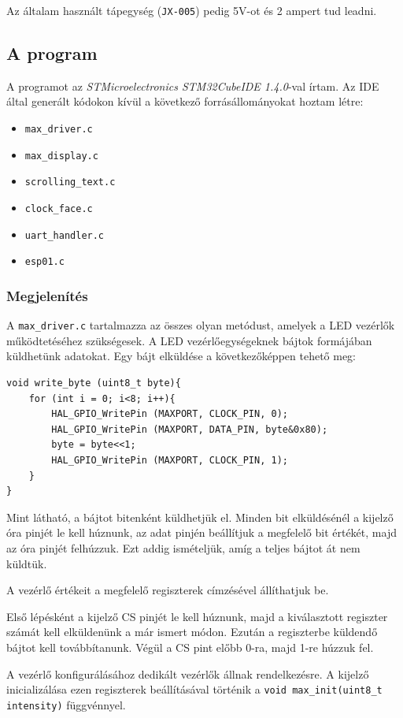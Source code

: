 \documentclass[a4paper, 12pt]{article}
\begin{document}
Az általam használt tápegység (\texttt{JX-005}) pedig 5V-ot és 2 ampert tud leadni.

\subsection{A program}

A programot az \textit{STMicroelectronics STM32CubeIDE 1.4.0}-val írtam.
Az IDE által generált kódokon kívül a következő forrásállományokat hoztam létre:
\begin{itemize}[noitemsep]
	\item \texttt{max\_driver.c}
	\item \texttt{max\_display.c}
	\item \texttt{scrolling\_text.c}
	\item \texttt{clock\_face.c}
	\item \texttt{uart\_handler.c}
	\item \texttt{esp01.c}
\end{itemize}

\subsubsection{Megjelenítés}

A \texttt{max\_driver.c} tartalmazza az összes olyan metódust, amelyek a LED vezérlők működtetéséhez szükségesek.
A LED vezérlőegységeknek bájtok formájában küldhetünk adatokat.
Egy bájt elküldése a következőképpen tehető meg:
\begin{lstlisting}[style=CStyle]
void write_byte (uint8_t byte){
	for (int i = 0; i<8; i++){
		HAL_GPIO_WritePin (MAXPORT, CLOCK_PIN, 0);
		HAL_GPIO_WritePin (MAXPORT, DATA_PIN, byte&0x80);
		byte = byte<<1;
		HAL_GPIO_WritePin (MAXPORT, CLOCK_PIN, 1);
	}
}
\end{lstlisting}
Mint látható, a bájtot bitenként küldhetjük el. Minden bit elküldésénél a kijelző óra pinjét le kell húznunk, az adat pinjén beállítjuk a megfelelő bit értékét, majd az óra pinjét felhúzzuk. Ezt addig ismételjük, amíg a teljes bájtot át nem küldtük.

A vezérlő értékeit a megfelelő regiszterek címzésével állíthatjuk be.

Első lépésként a kijelző CS pinjét le kell húznunk, majd a kiválasztott regiszter számát kell elküldenünk a már ismert módon. Ezután a regiszterbe küldendő bájtot kell továbbítanunk. Végül a CS pint előbb 0-ra, majd 1-re húzzuk fel.

A vezérlő konfigurálásához dedikált vezérlők állnak rendelkezésre. A kijelző inicializálása ezen regiszterek beállításával történik a \texttt{void max\_init(uint8\_t intensity)} függvénnyel.
\end{document}
